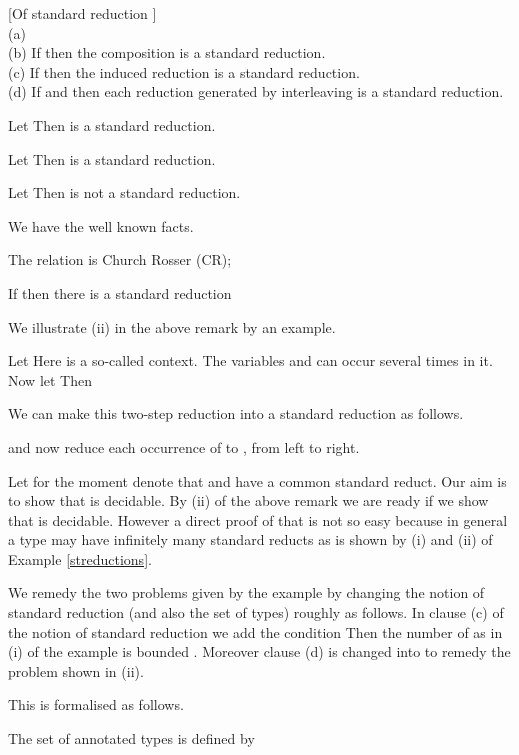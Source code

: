 \documentclass[11pt,aslarticle,xperspectives,bibay3]{asl}
\begin{document}
{\bdf\label{standardreduction}[Of standard reduction ]\\
 (a) \\
(b) If  then the composition  is a standard reduction.\\
(c) If  then the induced reduction  is a standard reduction.\\
(d) If  and   then each reduction  generated by interleaving is a standard reduction.
\edf


\begin{example}\label{streductions}
\bsub\fit Let  Then  is a standard reduction.
\item Let  Then  is a standard reduction.
\item Let  Then  is not a standard reduction. 
\esub
\end{example} 

\brem\label{facts} We have the well known facts.
\bsub \item The relation  is Church Rosser (CR);
\item If  then there is a standard reduction 
\esub
\erem

We illustrate (ii) in the above remark by an example.
\begin{example}\label{examplestreduction}
Let  Here  is a so-called context. The variables  and  can occur several times in it. Now let  Then

We can make this two-step reduction into a standard reduction as follows.

and now reduce each occurrence of  to , from left to right.
\end{example}

Let for the moment  denote that  and  have a common standard reduct. Our aim is to show that  is decidable. By (ii) of the above remark we are ready if we show that  is decidable. However a direct proof of that is not so easy because in general a type  may have infinitely many standard reducts as is shown by (i) and (ii) of Example \ref{streductions}.

We remedy the two problems given by the example by changing the notion of standard reduction (and also the set of types)  roughly as follows. In clause (c) of the notion of standard reduction we add the condition  Then the number of  as in (i) of the  example  is bounded . Moreover clause (d) is changed into  to remedy the problem shown in (ii).

This is formalised as follows.

\label{annotatedtypestmua}
\bsub\fit The set of annotated types  is defined by

}
\end{document}
